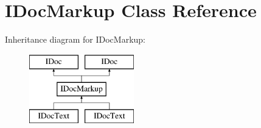 \hypertarget{class_i_doc_markup}{}\section{I\+Doc\+Markup Class Reference}
\label{class_i_doc_markup}
Inheritance diagram for I\+Doc\+Markup\+:\begin{figure}[H]
\begin{center}
\leavevmode
\includegraphics[height=3.000000cm]{class_i_doc_markup}
\end{center}
\end{figure}
